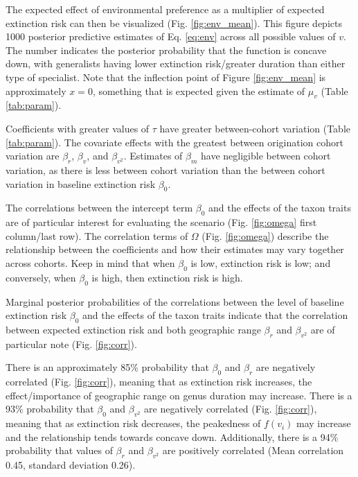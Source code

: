 \documentclass{article}
\begin{document}
The expected effect of environmental preference as a multiplier of expected extinction risk can then be visualized (Fig. \ref{fig:env_mean}). This figure depicts 1000 posterior predictive estimates of Eq. \ref{eq:env} across all possible values of \(v\). The number indicates the posterior probability that the function is concave down, with generalists having lower extinction risk/greater duration than either type of specialist. Note that the inflection point of Figure \ref{fig:env_mean} is approximately \(x = 0\), something that is expected given the estimate of \(\mu_{v}\) (Table \ref{tab:param}).

Coefficients with greater values of \(\tau\) have greater between-cohort variation (Table \ref{tab:param}). The covariate effects with the greatest between origination cohort variation are \(\beta_{r}\), \(\beta_{v}\), and \(\beta_{v^{2}}\). Estimates of \(\beta_{m}\) have negligible between cohort variation, as there is less between cohort variation than the between cohort variation in baseline extinction risk \(\beta_{0}\). 

The correlations between the intercept term \(\beta_{0}\) and the effects of the taxon traits are of particular interest for evaluating the \citet{Jablonski1986} scenario (Fig. \ref{fig:omega} first column/last row). The correlation terms of \(\Omega\) (Fig. \ref{fig:omega}) describe the relationship between the coefficients and how their estimates may vary together across cohorts. Keep in mind that when \(\beta_{0}\) is low, extinction risk is low; and conversely, when \(\beta_{0}\) is high, then extinction risk is high.

Marginal posterior probabilities of the correlations between the level of baseline extinction risk \(\beta_{0}\) and the effects of the taxon traits indicate that the correlation between expected extinction risk and both geographic range \(\beta_{r}\) and \(\beta_{v^{2}}\) are of particular note (Fig. \ref{fig:corr}). 

There is an approximately 85\% probability that \(\beta_{0}\) and \(\beta_{r}\) are negatively correlated (Fig. \ref{fig:corr}), meaning that as extinction risk increases, the effect/importance of geographic range on genus duration may increase. There is a 93\% probability that \(\beta_{0}\) and \(\beta_{v^{2}}\) are negatively correlated (Fig. \ref{fig:corr}), meaning that as extinction risk decreases, the peakedness of \(f(v_{i})\) may increase and the relationship tends towards concave down. Additionally, there is a 94\% probability that values of \(\beta_{r}\) and \(\beta_{v^{2}}\) are positively correlated (Mean correlation 0.45, standard deviation 0.26).
\end{document}
